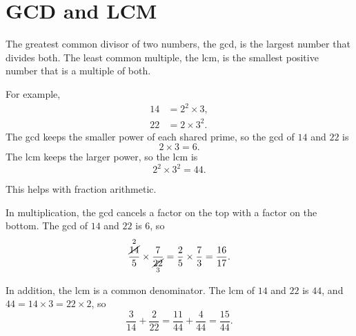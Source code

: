 \section{GCD and LCM}

The greatest common divisor of two numbers, the gcd, is the largest number that divides both. The least common multiple, the lcm, is the smallest positive number that is a multiple of both.

For example,
\begin{align*}
14 &= 2^{2} \times 3, \\
22 &= 2 \times 3^{2}.
\end{align*}
The gcd keeps the smaller power of each shared prime, so the gcd of $14$ and $22$ is
\[
2 \times 3 = 6.
\]
The lcm keeps the larger power, so the lcm is
\[
2^{2} \times 3^{2} = 44.
\]

This helps with fraction arithmetic.

In multiplication, the gcd cancels a factor on the top with a factor on the bottom. The gcd of $14$ and $22$ is $6$, so
\[
\frac{\overset{2}{\cancel{14}}}{5} \times \frac{7}{\underset{3}{\cancel{22}}} = \frac{2}{5} \times \frac{7}{3} = \frac{16}{17}.
\]

In addition, the lcm is a common denominator. The lcm of $14$ and $22$ is $44$, and $44 = 14 \times 3 = 22 \times 2$, so
\[
\frac{3}{14} + \frac{2}{22} = \frac{11}{44} + \frac{4}{44} = \frac{15}{44}.
\]
